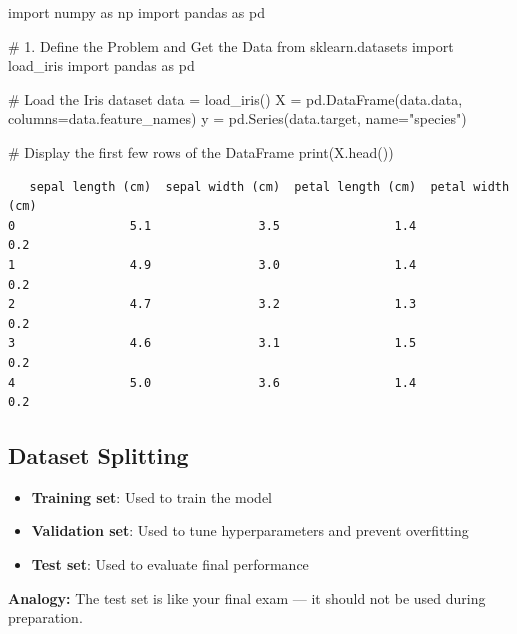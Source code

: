 \documentclass[
  letterpaper,
  DIV=11,
  numbers=noendperiod]{scrreprt}
\newenvironment{Shaded}{\begin{snugshade}}{\end{snugshade}}
\newcommand{\BuiltInTok}[1]{\textcolor[rgb]{0.00,0.23,0.31}{#1}}
\newcommand{\CommentTok}[1]{\textcolor[rgb]{0.37,0.37,0.37}{#1}}
\newcommand{\ImportTok}[1]{\textcolor[rgb]{0.00,0.46,0.62}{#1}}
\newcommand{\NormalTok}[1]{\textcolor[rgb]{0.00,0.23,0.31}{#1}}
\newcommand{\OperatorTok}[1]{\textcolor[rgb]{0.37,0.37,0.37}{#1}}
\newcommand{\StringTok}[1]{\textcolor[rgb]{0.13,0.47,0.30}{#1}}
\providecommand{\tightlist}{%
  \setlength{\itemsep}{0pt}\setlength{\parskip}{0pt}}\usepackage{longtable,booktabs,array}
\begin{document}
import numpy as np import pandas as pd

\begin{Shaded}
\begin{Highlighting}[]
\CommentTok{\# 1. Define the Problem and Get the Data}
\ImportTok{from}\NormalTok{ sklearn.datasets }\ImportTok{import}\NormalTok{ load\_iris}
\ImportTok{import}\NormalTok{ pandas }\ImportTok{as}\NormalTok{ pd}

\CommentTok{\# Load the Iris dataset}
\NormalTok{data }\OperatorTok{=}\NormalTok{ load\_iris()}
\NormalTok{X }\OperatorTok{=}\NormalTok{ pd.DataFrame(data.data, columns}\OperatorTok{=}\NormalTok{data.feature\_names)}
\NormalTok{y }\OperatorTok{=}\NormalTok{ pd.Series(data.target, name}\OperatorTok{=}\StringTok{"species"}\NormalTok{)}

\CommentTok{\# Display the first few rows of the DataFrame}
\BuiltInTok{print}\NormalTok{(X.head())}
\end{Highlighting}
\end{Shaded}

\begin{verbatim}
   sepal length (cm)  sepal width (cm)  petal length (cm)  petal width (cm)
0                5.1               3.5                1.4               0.2
1                4.9               3.0                1.4               0.2
2                4.7               3.2                1.3               0.2
3                4.6               3.1                1.5               0.2
4                5.0               3.6                1.4               0.2
\end{verbatim}

\subsection{Dataset Splitting}\label{dataset-splitting}

\begin{itemize}
\tightlist
\item
  \textbf{Training set}: Used to train the model\\
\item
  \textbf{Validation set}: Used to tune hyperparameters and prevent
  overfitting\\
\item
  \textbf{Test set}: Used to evaluate final performance
\end{itemize}

\textbf{Analogy:} The test set is like your final exam --- it should not
be used during preparation.
\end{document}
